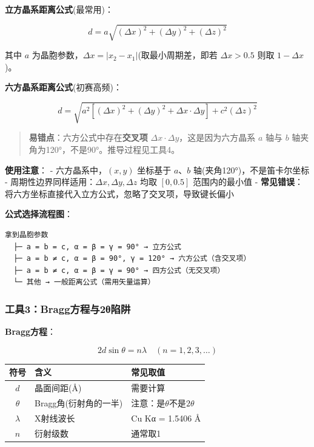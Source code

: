 \textbf{立方晶系距离公式}(最常用)：

\[d = a\sqrt{(\Delta x)^2 + (\Delta y)^2 + (\Delta z)^2}\]

其中 \(a\) 为晶胞参数，\(\Delta x = |x_2 - x_1|\)(取最小周期差，即若 \(\Delta x > 0.5\) 则取 \(1 - \Delta x\))。

\textbf{六方晶系距离公式}(初赛高频)：

\[d = \sqrt{a^2[(\Delta x)^2 + (\Delta y)^2 + \Delta x \cdot \Delta y] + c^2(\Delta z)^2}\]

\begin{quote}
\textbf{易错点}：六方公式中存在\textbf{交叉项} \(\Delta x \cdot \Delta y\)，这是因为六方晶系 \(a\) 轴与 \(b\) 轴夹角为120°，不是90°。推导过程见工具4。
\end{quote}

\textbf{使用注意}：
- 六方晶系中，\((x, y)\) 坐标基于 \(a\)、\(b\) 轴(夹角120°)，不是笛卡尔坐标
- 周期性边界同样适用：\(\Delta x, \Delta y, \Delta z\) 均取 \([0, 0.5]\) 范围内的最小值
- \textbf{常见错误}：将六方坐标直接代入立方公式，忽略了交叉项，导致键长偏小

\textbf{公式选择流程图}：

\begin{verbatim}
拿到晶胞参数
  ├─ a = b = c, α = β = γ = 90° → 立方公式
  ├─ a = b ≠ c, α = β = 90°, γ = 120° → 六方公式（含交叉项）
  ├─ a = b ≠ c, α = β = γ = 90° → 四方公式（无交叉项）
  └─ 其他 → 一般距离公式（需用矢量运算）
\end{verbatim}

\subsubsection{工具3：Bragg方程与2θ陷阱}\label{ux5de5ux51773braggux65b9ux7a0bux4e0e2ux3b8ux9677ux9631}

\textbf{Bragg方程}：

\[2d\sin\theta = n\lambda \quad (n = 1, 2, 3, \ldots)\]

{\def\LTcaptype{none} %
\begin{longtable}[]{@{}cll@{}}
\toprule\noalign{}
符号 & 含义 & 常见取值 \\
\midrule\noalign{}
\endhead
\bottomrule\noalign{}
\endlastfoot
\(d\) & 晶面间距(Å) & 需要计算 \\
\(\theta\) & Bragg角(衍射角的一半) & 注意：是\(\theta\)不是\(2\theta\) \\
\(\lambda\) & X射线波长 & Cu Kα = 1.5406 Å \\
\(n\) & 衍射级数 & 通常取1 \\
\end{longtable}
}


